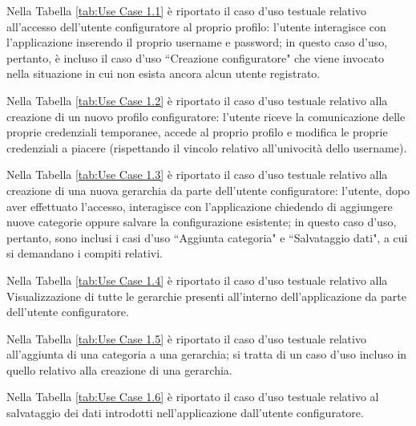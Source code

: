 Nella Tabella \ref{tab:Use Case 1.1} è riportato il caso d'uso testuale relativo all'accesso dell'utente configuratore al proprio profilo: l'utente interagisce con l'applicazione inserendo il proprio username e password; in questo caso d'uso, pertanto, è incluso il caso d'uso ``Creazione configuratore" che viene invocato nella situazione in cui non esista ancora alcun utente registrato.\bigskip

Nella Tabella \ref{tab:Use Case 1.2} è riportato il caso d'uso testuale relativo alla creazione di un nuovo profilo configuratore: l'utente riceve la comunicazione delle proprie credenziali temporanee, accede al proprio profilo e modifica le proprie credenziali a piacere (rispettando il vincolo relativo all'univocità dello username).\bigskip

Nella Tabella \ref{tab:Use Case 1.3} è riportato il caso d'uso testuale relativo alla creazione di una nuova gerarchia da parte dell'utente configuratore: l'utente, dopo aver effettuato l'accesso, interagisce con l'applicazione chiedendo di aggiungere nuove categorie oppure salvare la configurazione esistente; in questo caso d'uso, pertanto, sono inclusi i casi d'uso ``Aggiunta categoria" e ``Salvataggio dati", a cui si demandano i compiti relativi.\bigskip

Nella Tabella \ref{tab:Use Case 1.4} è riportato il caso d'uso testuale relativo alla Visualizzazione di tutte le gerarchie presenti all'interno dell'applicazione da parte dell'utente configuratore.\bigskip

Nella Tabella \ref{tab:Use Case 1.5} è riportato il caso d'uso testuale relativo all'aggiunta di una categoria a una gerarchia; si tratta di un caso d'uso incluso in quello relativo alla creazione di una gerarchia.\bigskip

Nella Tabella \ref{tab:Use Case 1.6} è riportato il caso d'uso testuale relativo al salvataggio dei dati introdotti nell'applicazione dall'utente configuratore.\bigskip
